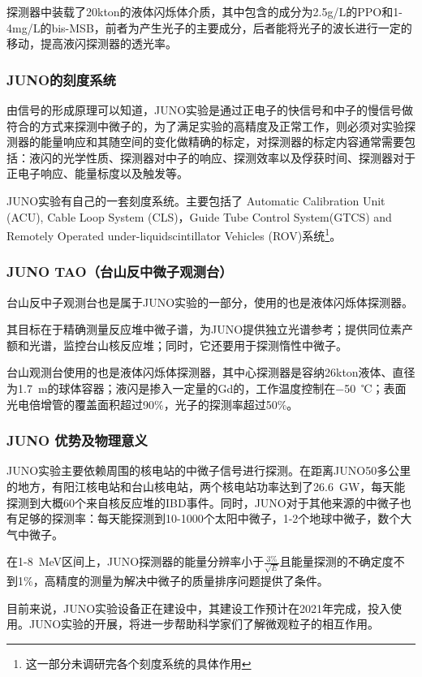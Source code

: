 \documentclass[10pt,a4paper]{article}
\begin{document}
探测器中装载了20kton的液体闪烁体介质，其中包含的成分为2.5g/L的PPO和1-4mg/L的bis-MSB，前者为产生光子的主要成分，后者能将光子的波长进行一定的移动，提高液闪探测器的透光率。

\subsubsection{JUNO的刻度系统}\label{sub:logicinter}
由信号的形成原理可以知道，JUNO实验是通过正电子的快信号和中子的慢信号做符合的方式来探测中微子的，为了满足实验的高精度及正常工作，则必须对实验探测器的能量响应和其随空间的变化做精确的标定，对探测器的标定内容通常需要包括：液闪的光学性质、探测器对中子的响应、探测效率以及俘获时间、探测器对于正电子响应、能量标度以及触发等。

JUNO实验有自己的一套刻度系统。主要包括了 Automatic Calibration Unit (ACU),
Cable Loop System (CLS)，Guide Tube Control System(GTCS) and Remotely Operated under-liquidscintillator Vehicles (ROV)系统\footnote{这一部分未调研完各个刻度系统的具体作用}。

\subsubsection{JUNO TAO（台山反中微子观测台）}\label{sub:logicinter}

台山反中子观测台也是属于JUNO实验的一部分，使用的也是液体闪烁体探测器。

其目标在于精确测量反应堆中微子谱，为JUNO提供独立光谱参考；提供同位素产额和光谱，监控台山核反应堆；同时，它还要用于探测惰性中微子。

台山观测台使用的也是液体闪烁体探测器，其中心探测器是容纳26kton液体、直径为\SI{1.7}{m}的球体容器；液闪是掺入一定量的Gd的，工作温度控制在\SI{-50}{℃}；表面光电倍增管的覆盖面积超过90\%，光子的探测率超过50\%。



\subsubsection{JUNO 优势及物理意义}\label{sub:logicinter}

JUNO实验主要依赖周围的核电站的中微子信号进行探测。在距离JUNO50多公里的地方，有阳江核电站和台山核电站，两个核电站功率达到了\SI{26.6}{GW}，每天能探测到大概60个来自核反应堆的IBD事件。同时，JUNO对于其他来源的中微子也有足够的探测率：每天能探测到10-1000个太阳中微子，1-2个地球中微子，数个大气中微子。

在1-\SI{8 }{MeV}区间上，JUNO探测器的能量分辨率小于$\frac{3\%}{\sqrt{E}}$且能量探测的不确定度不到1\%，高精度的测量为解决中微子的质量排序问题提供了条件。

目前来说，JUNO实验设备正在建设中，其建设工作预计在2021年完成，投入使用。JUNO实验的开展，将进一步帮助科学家们了解微观粒子的相互作用。
\end{document}
